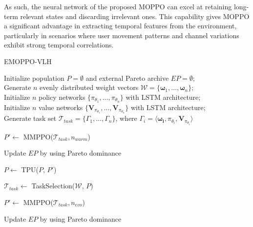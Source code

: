\documentclass[10pt,journal,compsoc]{IEEEtran}
\begin{document}
\par As such, the neural network of the proposed MOPPO can excel at retaining long-term relevant states and discarding irrelevant ones. This capability gives MOPPO a significant advantage in extracting temporal features from the environment, particularly in scenarios where user movement patterns and channel variations exhibit strong temporal correlations.

\begin{algorithm}[t]
    \caption{EMOPPO-VLH}
    \label{alg:IEMORL}
    Initialize population $P = \emptyset$ and external Pareto archive $EP = \emptyset$; \\
    
    Generate $n$ evenly distributed weight vectors $\mathcal{W} = \{\boldsymbol{\omega}_1, \dots, \boldsymbol{\omega}_n\}$; \\
    
    Initialize $n$ policy networks $\{\pi_{\theta_1}, \dots, \pi_{\theta_n}\}$ with LSTM architecture; \\

    Initialize $n$ value networks $\{ \boldsymbol{V}_{\pi_{\theta_1}}, \dots, \boldsymbol{V}_{\pi_{\theta_n}} \}$ with LSTM architecture; \\

    Generate task set $\mathcal{T}_{task} = \{ \Gamma_1, \dots, \Gamma_n \}$, where $\Gamma_i = \langle \boldsymbol{\omega_i}, \pi_{\theta_i}, \boldsymbol{V}_{\pi_{\theta_i}} \rangle$\; 

    $P' \leftarrow$ MMPPO($\mathcal{T}_{task}, n_{warm}$) 

    Update $EP$ by using Pareto dominance\;
    

     { 

        $P \leftarrow$ TPU($P$, $P'$)
    
        $\mathcal{T}_{task} \leftarrow $ TaskSelection($\mathcal{W}$, $P$)

        $P' \leftarrow$ MMPPO($\mathcal{T}_{task}, n_{evo}$)

        Update $EP$ by using Pareto dominance\; 

    }
\end{algorithm}
\end{document}
